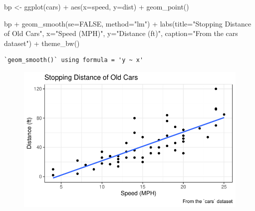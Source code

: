 \documentclass[
  letterpaper,
  DIV=11,
  numbers=noendperiod]{scrartcl}
\newenvironment{Shaded}{\begin{snugshade}}{\end{snugshade}}
\newcommand{\AttributeTok}[1]{\textcolor[rgb]{0.40,0.45,0.13}{#1}}
\newcommand{\ConstantTok}[1]{\textcolor[rgb]{0.56,0.35,0.01}{#1}}
\newcommand{\FunctionTok}[1]{\textcolor[rgb]{0.28,0.35,0.67}{#1}}
\newcommand{\NormalTok}[1]{\textcolor[rgb]{0.00,0.23,0.31}{#1}}
\newcommand{\OtherTok}[1]{\textcolor[rgb]{0.00,0.23,0.31}{#1}}
\newcommand{\SpecialCharTok}[1]{\textcolor[rgb]{0.37,0.37,0.37}{#1}}
\newcommand{\StringTok}[1]{\textcolor[rgb]{0.13,0.47,0.30}{#1}}
\begin{document}
\begin{Shaded}
\begin{Highlighting}[]
\NormalTok{bp }\OtherTok{\textless{}{-}} \FunctionTok{ggplot}\NormalTok{(cars) }\SpecialCharTok{+}
  \FunctionTok{aes}\NormalTok{(}\AttributeTok{x=}\NormalTok{speed, }\AttributeTok{y=}\NormalTok{dist) }\SpecialCharTok{+}
  \FunctionTok{geom\_point}\NormalTok{()}
\end{Highlighting}
\end{Shaded}

\begin{Shaded}
\begin{Highlighting}[]
\NormalTok{bp }\SpecialCharTok{+} \FunctionTok{geom\_smooth}\NormalTok{(}\AttributeTok{se=}\ConstantTok{FALSE}\NormalTok{, }\AttributeTok{method=}\StringTok{"lm"}\NormalTok{) }\SpecialCharTok{+}
  \FunctionTok{labs}\NormalTok{(}\AttributeTok{title=}\StringTok{"Stopping Distance of Old Cars"}\NormalTok{,}
       \AttributeTok{x=}\StringTok{"Speed (MPH)"}\NormalTok{,}
       \AttributeTok{y=}\StringTok{"Distance (ft)"}\NormalTok{,}
       \AttributeTok{caption=}\StringTok{"From the \textasciigrave{}cars\textasciigrave{} dataset"}\NormalTok{) }\SpecialCharTok{+}
  \FunctionTok{theme\_bw}\NormalTok{()}
\end{Highlighting}
\end{Shaded}

\begin{verbatim}
`geom_smooth()` using formula = 'y ~ x'
\end{verbatim}

\begin{figure}[H]

{\centering \includegraphics{Class05_files/figure-pdf/unnamed-chunk-8-1.pdf}

}

\end{figure}
\end{document}
